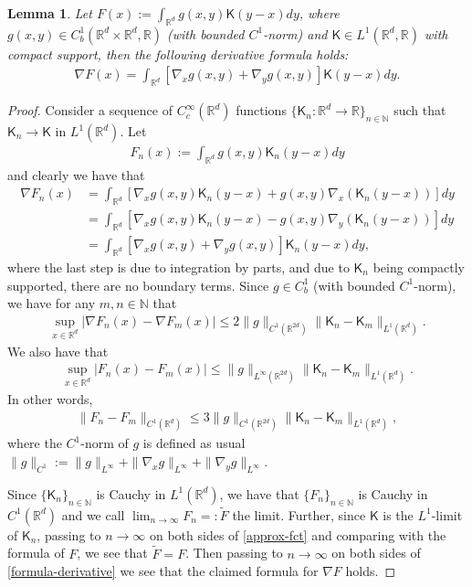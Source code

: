 \documentclass[a4paper,11pt]{amsart}
\newtheorem{lemma}[theorem]{Lemma}
\newcommand{\red}[1]{{#1}}
\newcommand{\N}{\mathbb{N}}
\newcommand{\R}{\mathbb{R}}
\newcommand{\wt}{\widetilde}
\numberwithin{equation}{section}
\numberwithin{theorem}{section}
\theoremstyle{definition}
\begin{document}
\begin{lemma}\label{lem:derivative}
Let $F(x):=\int_{\red{\R^d}}g(x,y)\mathsf K(y-x)dy$, where 
$g(x,y)\in C^1_b(\R^d\times\R^d,\R)$ \red{(with bounded $C^1$-norm)} and $\mathsf K\in L^1(\R^d,\R)$ with compact support, then the following derivative formula holds:
\begin{align*}
\nabla F(x)=\int_{\red{\R^d}}\left[\nabla_x g(x,y)+\nabla_yg(x,y) \right] \mathsf K(y-x) dy.
\end{align*}
\end{lemma}

\begin{proof}
Consider a sequence of $C_c^\infty(\R^d)$ functions $\{\mathsf K_n: \R^d\to\R\}_{n\in\N}$ such that $\mathsf K_n\to\mathsf K$ in $L^1(\R^d)$. Let 
\begin{align}\label{approx-fct}
F_n(x):=\int_{\R^d}g(x,y)\mathsf K_n(y-x)dy
\end{align}
and clearly we have that 
\begin{align}
\nabla F_n(x)&=\int_{\R^d}\left[\nabla_x g(x,y)\mathsf K_n(y-x)+g(x,y)\nabla_x (\mathsf K_n(y-x))\right] dy  \nonumber\\
&=\int_{\R^d}\left[\nabla_x g(x,y)\mathsf K_n(y-x)-g(x,y)\nabla_y (\mathsf K_n(y-x))\right] dy   \nonumber\\
&=\int_{\R^d}\left[\nabla_x g(x,y)+\nabla_yg(x,y) \right] \mathsf K_n(y-x) dy,   \label{formula-derivative}
\end{align}
where the last step is due to integration by parts, \red{and due to $\mathsf K_n$ being compactly supported, there are no boundary terms}. Since $g\in C^1_b$ (with bounded $C^1$-norm), we have for any $m,n\in\N$ that 
\begin{align*}
\sup_{x\in\R^d}|\nabla F_n(x)-\nabla F_m(x)|\le 2\|g\|_{C^1(\R^{2d})}\|\mathsf K_n- \mathsf K_m\|_{L^1(\R^d)}.
\end{align*}
We also have that 
\begin{align*}
\sup_{x\in\R^d}|F_n(x)-F_m(x)|\le \|g\|_{L^\infty(\R^{2d})}\|\mathsf K_n- \mathsf K_m\|_{L^1(\R^d)}.
\end{align*}
In other words,
\begin{align*}
\|F_n-F_m\|_{C^1(\R^d)}\le 3\|g\|_{C^1(\R^{2d})}\|\mathsf K_n-\mathsf K_m\|_{L^1(\R^d)},
\end{align*}
where the $C^1$-norm of $g$ is defined as usual  $\|g\|_{C^1}:=\|g\|_{L^\infty}+\|\nabla_x g\|_{L^\infty}+\|\nabla_yg\|_{L^\infty}$. 

Since $\{\mathsf K_n\}_{n\in\N}$ is Cauchy in $L^1(\R^d)$, we have that $\{F_n\}_{n\in\N}$ is Cauchy in $C^1(\R^d)$ and we call $\lim_{n\to\infty}F_n=:\wt F$ the limit. Further, since $\mathsf K$ is the $L^1$-limit of $\mathsf K_n$, passing to $n\to\infty$ on both sides of \eqref{approx-fct} and comparing with the formula of $F$, we see that $\wt F=F$. Then passing to $n\to\infty$ on both sides of \eqref{formula-derivative} we see that the claimed formula for $\nabla F$ holds.
\end{proof}
\end{document}
